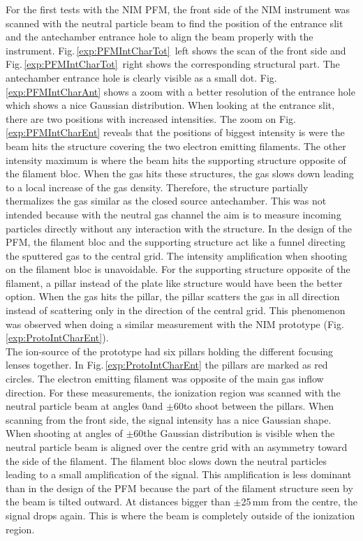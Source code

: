 	For the first tests with the NIM PFM, the front side of the NIM instrument was scanned with the neutral particle beam to find the position of the entrance slit and the antechamber entrance hole to align the beam properly with the instrument. Fig.\,\ref{exp:PFMIntCharTot}~left shows the scan of the front side and Fig.\,\ref{exp:PFMIntCharTot}~right shows the corresponding structural part. The antechamber entrance hole is clearly visible as a small dot. Fig.\,\ref{exp:PFMIntCharAnt} shows a zoom with a better resolution of the entrance hole which shows a nice Gaussian distribution. When looking at the entrance slit, there are two positions with increased intensities. The zoom on Fig.\,\ref{exp:PFMIntCharEnt} reveals that the positions of biggest intensity is were the beam hits the structure covering the two electron emitting filaments. The other intensity maximum is where the beam hits the supporting structure opposite of the filament bloc. When the gas hits these structures, the gas slows down leading to a local increase of the gas density. Therefore, the structure partially thermalizes the gas similar as the closed source antechamber. This was not intended because with the neutral gas channel the aim is to measure incoming particles directly without any interaction with the structure. In the design of the PFM, the filament bloc and the supporting structure act like a funnel directing the sputtered gas to the central grid. The intensity amplification when shooting on the filament bloc is unavoidable. For the supporting structure opposite of the filament, a pillar instead of the plate like structure would have been the better option. When the gas hits the pillar, the pillar scatters the gas in all direction instead of scattering only in the direction of the central grid. This phenomenon was observed when doing a similar measurement with the NIM prototype (Fig.\,\ref{exp:ProtoIntCharEnt}).\\
	The ion-source of the prototype had six pillars holding the different focusing lenses together. In Fig.\,\ref{exp:ProtoIntCharEnt} the pillars are marked as red circles. The electron emitting filament was opposite of the main gas inflow direction. For these measurements, the ionization region was scanned with the neutral particle beam at angles 0\degree and $\pm$60\degree to shoot between the pillars. When scanning from the front side, the signal intensity has a nice Gaussian shape. When shooting at angles of $\pm$60\degree the Gaussian distribution is visible when the neutral particle beam is aligned over the centre grid with an asymmetry toward the side of the filament. The filament bloc slows down the neutral particles leading to a small amplification of the signal. This amplification is less dominant than in the design of the PFM because the part of the filament structure seen by the beam is tilted outward. At distances bigger than $\pm$25\,mm from the centre, the signal drops again. This is where the beam is completely outside of the ionization region.
